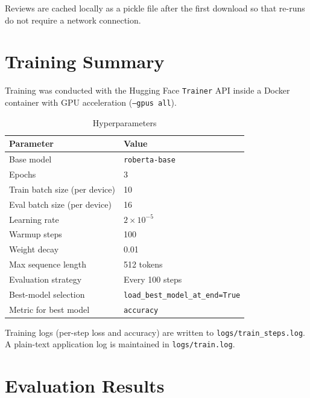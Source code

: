 \documentclass[12pt,a4paper]{article}
\begin{document}
Reviews are cached locally as a pickle file after the first download so that
re-runs do not require a network connection.

\section{Training Summary}

Training was conducted with the Hugging Face \texttt{Trainer} API inside a
Docker container with GPU acceleration (\texttt{--gpus all}).

\begin{table}[h]
\centering
\caption{Hyperparameters}
\begin{tabular}{ll}
\toprule
\textbf{Parameter}                & \textbf{Value} \\
\midrule
Base model                        & \texttt{roberta-base} \\
Epochs                            & 3 \\
Train batch size (per device)     & 10 \\
Eval batch size (per device)      & 16 \\
Learning rate                     & $2 \times 10^{-5}$ \\
Warmup steps                      & 100 \\
Weight decay                      & 0.01 \\
Max sequence length               & 512 tokens \\
Evaluation strategy               & Every 100 steps \\
Best-model selection              & \texttt{load\_best\_model\_at\_end=True} \\
Metric for best model             & \texttt{accuracy} \\
\bottomrule
\end{tabular}
\end{table}

Training logs (per-step loss and accuracy) are written to
\texttt{logs/train\_steps.log}.  A plain-text application log is maintained
in \texttt{logs/train.log}.

\section{Evaluation Results}
\end{document}
